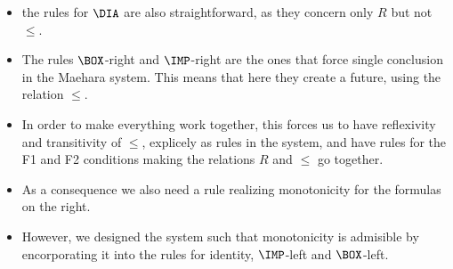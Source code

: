 {\begin{itemize}
\begin{itemize}
      identity, but there is a subtlety; see below...
    \item the rules for $\DIA$ are also straightforward, as they
      concern only $R$ but not $\le$.
    \item The rules $\BOX$-right and $\IMP$-right are the ones that
      force single conclusion in the Maehara system. This means that
      here they create a future, using the relation $\le$.
    \item In order to make everything work together, this forces us to
      have reflexivity and transitivity of $\le$, explicely as rules
      in the system, and have rules for the F1 and F2 conditions
      making the relations $R$ and $\le$ go together.
    \item As a consequence we also need a rule realizing monotonicity
      for the formulas on the right.
    \item However, we designed the system such that monotonicity is
      admisible by encorporating it into the rules for identity,
      $\IMP$-left and $\BOX$-left.
    \end{itemize}
  \end{itemize}
}
%
